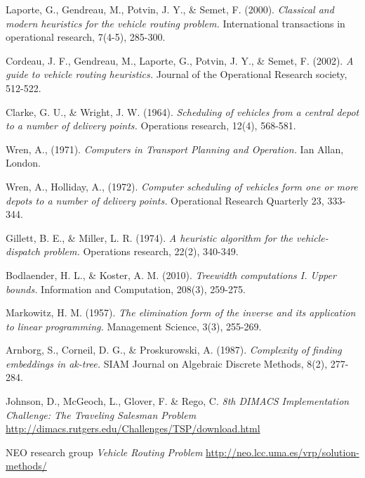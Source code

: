 \documentclass[12pt]{article}
\begin{document}
\begin{thebibliography}{9}
        Laporte, G., Gendreau, M., Potvin, J. Y., \& Semet, F. (2000).
        \emph{Classical and modern heuristics for the vehicle routing problem.}
        International transactions in operational research, 7(4-5), 285-300.

        Cordeau, J. F., Gendreau, M., Laporte, G., Potvin, J. Y., \& Semet, F. (2002).
        \emph{A guide to vehicle routing heuristics.}
        Journal of the Operational Research society, 512-522.

        Clarke, G. U., \& Wright, J. W. (1964).
        \emph{Scheduling of vehicles from a central depot to a number of delivery points.}
        Operations research, 12(4), 568-581.

        Wren, A., (1971).
        \emph{Computers in Transport Planning and Operation.}
        Ian Allan, London.

        Wren, A., Holliday, A., (1972).
        \emph{Computer scheduling of vehicles form one or more depots to a number of delivery points.}
        Operational Research Quarterly 23, 333-344.

        Gillett, B. E., \& Miller, L. R. (1974).
        \emph{A heuristic algorithm for the vehicle-dispatch problem.}
        Operations research, 22(2), 340-349.

        Bodlaender, H. L., \& Koster, A. M. (2010).
        \emph{Treewidth computations I. Upper bounds.}
        Information and Computation, 208(3), 259-275.

        Markowitz, H. M. (1957).
        \emph{The elimination form of the inverse and its application to linear programming.}
        Management Science, 3(3), 255-269.

        Arnborg, S., Corneil, D. G., \& Proskurowski, A. (1987).
        \emph{Complexity of finding embeddings in ak-tree.}
        SIAM Journal on Algebraic Discrete Methods, 8(2), 277-284.

        Johnson, D., McGeoch, L., Glover, F. \& Rego, C.
        \emph{8th DIMACS Implementation Challenge: The Traveling Salesman Problem}
        \url{http://dimacs.rutgers.edu/Challenges/TSP/download.html}

        NEO research group
        \emph{Vehicle Routing Problem}
        \url{http://neo.lcc.uma.es/vrp/solution-methods/}


\end{thebibliography}
\end{document}
